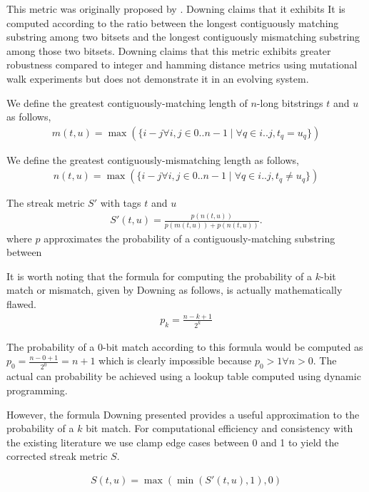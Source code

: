 This metric was originally proposed by \citep{downing2015intelligence}.
Downing claims that it exhibits
It is computed according to the ratio between the longest contiguously matching substring among two bitsets and the longest contiguously mismatching substring among those two bitsets.
Downing claims that this metric exhibits greater robustness compared to integer and hamming distance metrics using mutational walk experiments but does not demonstrate it in an evolving system.

We define the greatest contiguously-matching length of $n$-long bitstrings $t$ and $u$ as follows,
\begin{align*}
m(t, u) = \max(\{i - j \forall i, j \in 0..n-1 \mid \forall q \in i..j, t_q = u_q \})
\end{align*}

We define the greatest contiguously-mismatching length as follows,
\begin{align*}
n(t, u) = \max(\{i - j \forall i, j \in 0..n-1 \mid \forall q \in i..j, t_q \neq u_q \})
\end{align*}

The streak metric $S'$  with tags $t$ and $u$
\begin{align*}
S'(t, u)
= \frac{ p(n(t,u)) }{p(m(t,u)) + p(n(t,u))}.
\end{align*}
where $p$ approximates the probability of a contiguously-matching substring between

It is worth noting that the formula for computing the probability of a $k$-bit match or mismatch, given by Downing as follows, is actually mathematically flawed.
\begin{align*}
p_k
= \frac{n - k + 1}{2^k}
\end{align*}

The probability of a $0$-bit match according to this formula would be computed as $p_0 = \frac{n - 0 + 1}{2^0} = n + 1$ which is clearly impossible because $p_0 > 1 \forall n > 0$.
The actual can probability be achieved using a lookup table computed using dynamic programming.

However, the formula Downing presented provides a useful approximation to the probability of a $k$ bit match.
For computational efficiency and consistency with the existing literature we use clamp edge cases between 0 and 1 to yield the corrected streak metric $S$.

\begin{align*}
S(t, u) =
\max( \min( S'(t, u), 1), 0)
\end{align*}

